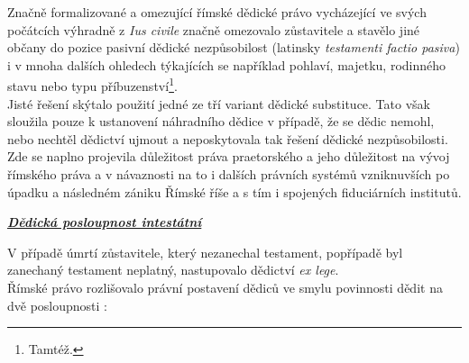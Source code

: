 \documentclass{article}
\begin{document}
Značně formalizované a omezující římské dědické právo vycházející ve svých počátcích výhradně z \textit{Ius civile} značně omezovalo zůstavitele a stavělo jiné občany do pozice pasivní dědické nezpůsobilost (latinsky \textit{testamenti factio pasiva}) i v mnoha dalších ohledech týkajících se například pohlaví, majetku, rodinného stavu nebo typu příbuzenství\footnote{Tamtéž.}.\\

Jisté řešení skýtalo použití jedné ze tří variant dědické substituce. Tato však sloužila pouze k ustanovení náhradního dědice v případě, že se dědic nemohl, nebo nechtěl dědictví ujmout a neposkytovala tak řešení dědické nezpůsobilosti.\\

Zde se naplno projevila důležitost práva praetorského a jeho důležitost na vývoj římského práva a v návaznosti na to i dalších právních systémů vzniknuv\-ších po úpadku a následném zániku Římské říše a s tím i spojených fiduciárních institutů.\\

\newpage

\underline{\textbf{\textit{Dědická posloupnost intestátní}}}

\vspace*{5 mm}

V případě úmrtí zůstavitele, který nezanechal testament, popřípadě byl zanechaný testament neplatný, nastupovalo dědictví \textit{ex lege}.\\


Římské právo rozlišovalo právní postavení dědiců ve smylu povinnosti dědit na dvě posloupnosti :

\vspace{5 mm}

\end{document}

